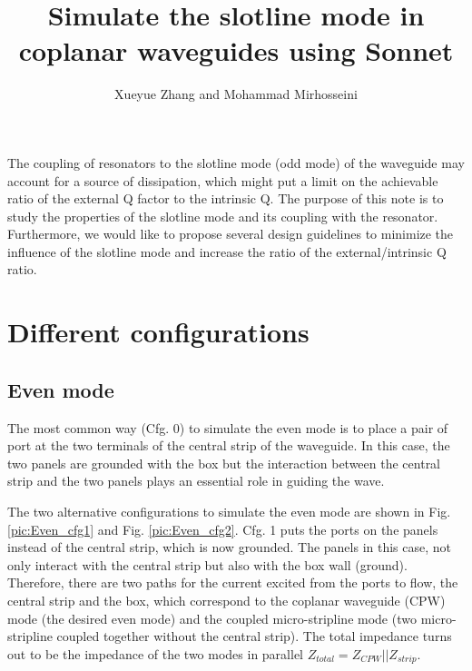 \documentclass[noshowpacs,amsmath,
superscriptaddress,
10pt]{article}
\begin{document}
\title{Simulate the slotline mode in coplanar waveguides using Sonnet}
\author{Xueyue Zhang and Mohammad Mirhosseini}

\maketitle

The coupling of resonators to the slotline mode (odd mode) of the waveguide may account for a source of dissipation, which might put a limit on the achievable ratio of the external Q factor to the intrinsic Q. The purpose of this note is to study the properties of the slotline mode and its coupling with the resonator. Furthermore, we would like to propose several design guidelines to minimize the influence of the slotline mode and increase the ratio of the external/intrinsic Q ratio.

\section{Different configurations}
\subsection{Even mode}

The most common way (Cfg. 0) to simulate the even mode is to place a pair of port at the two terminals of the central strip of the waveguide. In this case, the two panels are grounded with the box but the interaction between the central strip and the two panels plays an essential role in guiding the wave. 

The two alternative configurations to simulate the even mode are shown in Fig. \ref{pic:Even_cfg1} and Fig. \ref{pic:Even_cfg2}. Cfg. 1 puts the ports on the panels instead of the central strip, which is now grounded. The panels in this case, not only interact with the central strip but also with the box wall (ground). Therefore, there are two paths for the current excited from the ports to flow, the central strip and the box, which correspond to the coplanar waveguide (CPW) mode (the desired even mode) and the coupled micro-stripline mode (two micro-stripline coupled together without the central strip). The total impedance turns out to be the impedance of the two modes in parallel $Z_{total} = Z_{CPW}||Z_{strip}$.
\end{document}
